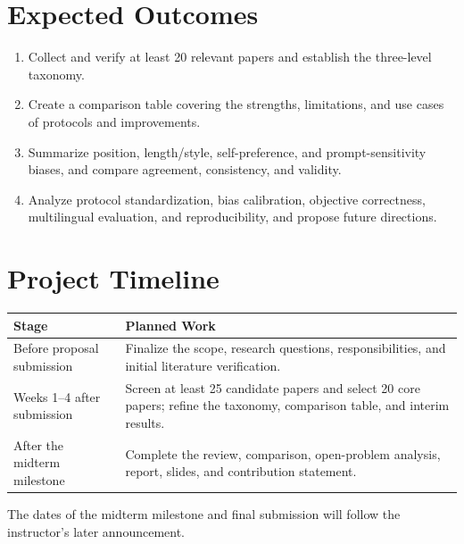 \documentclass[10pt]{article}
\begin{document}
\section{Expected Outcomes}
\begin{enumerate}
\item Collect and verify at least 20 relevant papers and establish the three-level taxonomy.
\item Create a comparison table covering the strengths, limitations, and use cases of protocols and improvements.
\item Summarize position, length/style, self-preference, and prompt-sensitivity biases, and compare agreement, consistency, and validity.
\item Analyze protocol standardization, bias calibration, objective correctness, multilingual evaluation, and reproducibility, and propose future directions.
\end{enumerate}

\section{Project Timeline}
\begin{tabularx}{\linewidth}{@{}lX@{}}
\toprule
\textbf{Stage} & \textbf{Planned Work}\\
\midrule
Before proposal submission & Finalize the scope, research questions, responsibilities, and initial literature verification.\\
Weeks 1--4 after submission & Screen at least 25 candidate papers and select 20 core papers; refine the taxonomy, comparison table, and interim results.\\
After the midterm milestone & Complete the review, comparison, open-problem analysis, report, slides, and contribution statement.\\
\bottomrule
\end{tabularx}

The dates of the midterm milestone and final submission will follow the instructor's later announcement.
\end{document}

